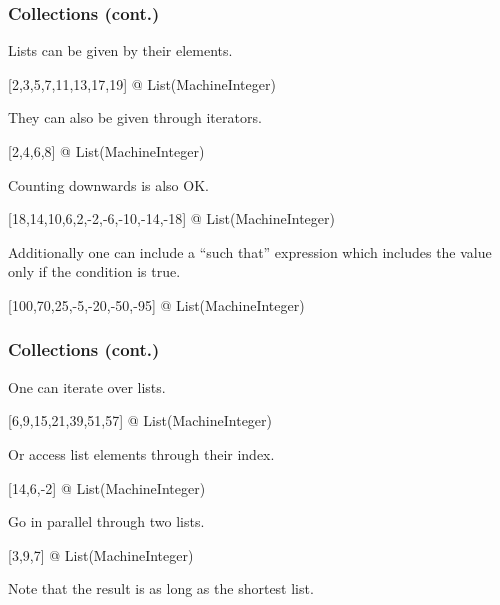\begin{frame}[fragile]
  \frametitle<presentation>{Collections (cont.)}

Lists can be given by their elements.
\begin{myverbatim}
[2,3,5,7,11,13,17,19] @ List(MachineInteger)
\end{myverbatim}
They can also be given through iterators.
\begin{myverbatim}
[2,4,6,8] @ List(MachineInteger)
\end{myverbatim}
Counting downwards is also OK.
\begin{myverbatim}
[18,14,10,6,2,-2,-6,-10,-14,-18] @ List(MachineInteger)
\end{myverbatim}
Additionally one can include a ``such that'' expression which includes
the value only if the condition is true.
\begin{myverbatim}
[100,70,25,-5,-20,-50,-95] @ List(MachineInteger)
\end{myverbatim}
\end{frame}














\begin{frame}[fragile]
  \frametitle<presentation>{Collections (cont.)}

One can iterate over lists.
\begin{myverbatim}
[6,9,15,21,39,51,57] @ List(MachineInteger)
\end{myverbatim}
Or access list elements through their index.
\begin{myverbatim}
[14,6,-2] @ List(MachineInteger)
\end{myverbatim}
Go in parallel through two lists.
\begin{myverbatim}
[3,9,7] @ List(MachineInteger)
\end{myverbatim}
Note that the result is as long as the shortest list.
\end{frame}






